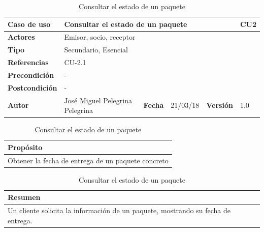 \documentclass[12pt,spanish]{article}
\begin{document}
\begin{table}[H]
\centering
\begin{tabular}{|m{3cm}|m{4cm}|m{2cm}|m{2cm}|m{2cm}|m{1cm}|}
\hline
\textbf{Caso de uso} &  \multicolumn{4}{m{8cm}|}{Consultar el estado de un paquete} \vline &  \cellcolor{gray!40}CU2 \\
\hline
\textbf{Actores} & \multicolumn{5}{m{8cm}|}{Emisor, socio, receptor} \\
\hline
\textbf{Tipo} & \multicolumn{5}{m{8cm}|}{Secundario, Esencial} \\
\hline
\textbf{Referencias} &\multicolumn{5}{m{8cm}|}{CU-2.1} \\
\hline
\textbf{Precondición} & \multicolumn{5}{m{8cm}|}{-} \\
\hline
\textbf{Postcondición} & \multicolumn{5}{m{8cm}|}{-} \\
\hline
\textbf{Autor} & José Miguel Pelegrina Pelegrina & \textbf{Fecha} & 21/03/18 & \textbf{Versión} & 1.0 \\
\hline
\end{tabular}

\vspace{1cm}

\begin{tabular}{|m{16.2cm}|}
\hline
\textbf{Propósito} \\
\hline
Obtener la fecha de entrega de un paquete concreto \\
\hline
\end{tabular}

\vspace{1cm}

\begin{tabular}{|m{16.2cm}|}
\hline
\textbf{Resumen} \\
\hline
Un cliente solicita la información de un paquete, mostrando su fecha de entrega. \\
\hline
\end{tabular}

\caption{Consultar el estado de un paquete}
\label{cu:2}
\end{table}
 

\end{document}
